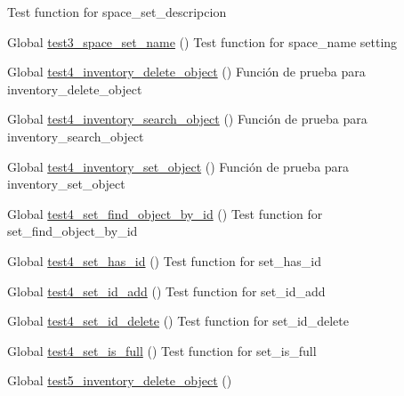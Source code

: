 \begin{DoxyRefList}
%
Test function for space\+\_\+set\+\_\+descripcion  
\item[Global \mbox{\hyperlink{space__test_8c_aa24a337830006e33706ab6ac1c416b47}{test3\+\_\+space\+\_\+set\+\_\+name}} ()]\label{test__test000199}%
%
Test function for space\+\_\+name setting  
\item[Global \mbox{\hyperlink{inventory__test_8c_a260ed194aa039d7cf055944a3bc1c2e6}{test4\+\_\+inventory\+\_\+delete\+\_\+object}} ()]\label{test__test000054}%
%
Función de prueba para inventory\+\_\+delete\+\_\+object  
\item[Global \mbox{\hyperlink{inventory__test_8c_ae04f282fdf617aff63c4207ee1e41d1e}{test4\+\_\+inventory\+\_\+search\+\_\+object}} ()]\label{test__test000065}%
%
Función de prueba para inventory\+\_\+search\+\_\+object  
\item[Global \mbox{\hyperlink{inventory__test_8c_a64b2d92f50bb388e75bb03355aa8b5eb}{test4\+\_\+inventory\+\_\+set\+\_\+object}} ()]\label{test__test000042}%
%
Función de prueba para inventory\+\_\+set\+\_\+object  
\item[Global \mbox{\hyperlink{set__test_8c_aa8ba0e1129a84844e4621d3ca86008ce}{test4\+\_\+set\+\_\+find\+\_\+object\+\_\+by\+\_\+id}} ()]\label{test__test000182}%
%
Test function for set\+\_\+find\+\_\+object\+\_\+by\+\_\+id  
\item[Global \mbox{\hyperlink{set__test_8c_a6a71db05b8235664b1e58668269f2a1f}{test4\+\_\+set\+\_\+has\+\_\+id}} ()]\label{test__test000178}%
%
Test function for set\+\_\+has\+\_\+id  
\item[Global \mbox{\hyperlink{set__test_8c_a9bdb9407c9e526d4175d443b0129f42c}{test4\+\_\+set\+\_\+id\+\_\+add}} ()]\label{test__test000165}%
%
Test function for set\+\_\+id\+\_\+add  
\item[Global \mbox{\hyperlink{set__test_8c_ac548868fd332f344efa73476cecaeed7}{test4\+\_\+set\+\_\+id\+\_\+delete}} ()]\label{test__test000169}%
%
Test function for set\+\_\+id\+\_\+delete  
\item[Global \mbox{\hyperlink{set__test_8c_a7c9b7ee9e08542c3d69a85d7620f632f}{test4\+\_\+set\+\_\+is\+\_\+full}} ()]\label{test__test000189}%
%
Test function for set\+\_\+is\+\_\+full  
\item[Global \mbox{\hyperlink{inventory__test_8c_a1646b8bd9957d8175d8af6b4f7607b73}{test5\+\_\+inventory\+\_\+delete\+\_\+object}} ()]\label{test__test000055}%

\end{DoxyRefList}
